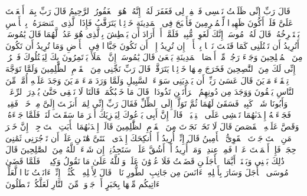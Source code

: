 \stopbuffer
\startbuffer[\q:28:16]
قَالَ رَبِّ إِنِّی ظَلَمۡتُ نَفۡسِی فَٱغۡفِرۡ لِی فَغَفَرَ لَهُۥۤۚ إِنَّهُۥ هُوَ ٱلۡغَفُورُ ٱلرَّحِیمُ%
\stopbuffer
\startbuffer[\q:28:17]
قَالَ رَبِّ بِمَاۤ أَنۡعَمۡتَ عَلَیَّ فَلَنۡ أَكُونَ ظَهِیرࣰا لِّلۡمُجۡرِمِینَ%
\stopbuffer
\startbuffer[\q:28:18]
فَأَصۡبَحَ فِی ٱلۡمَدِینَةِ خَاۤئِفࣰا یَتَرَقَّبُ فَإِذَا ٱلَّذِی ٱسۡتَنصَرَهُۥ بِٱلۡأَمۡسِ یَسۡتَصۡرِخُهُۥۚ قَالَ لَهُۥ مُوسَىٰۤ إِنَّكَ لَغَوِیࣱّ مُّبِینࣱ%
\stopbuffer
\startbuffer[\q:28:19]
فَلَمَّاۤ أَنۡ أَرَادَ أَن یَبۡطِشَ بِٱلَّذِی هُوَ عَدُوࣱّ لَّهُمَا قَالَ یَٰمُوسَىٰۤ أَتُرِیدُ أَن تَقۡتُلَنِی كَمَا قَتَلۡتَ نَفۡسَۢا بِٱلۡأَمۡسِۖ إِن تُرِیدُ إِلَّاۤ أَن تَكُونَ جَبَّارࣰا فِی ٱلۡأَرۡضِ وَمَا تُرِیدُ أَن تَكُونَ مِنَ ٱلۡمُصۡلِحِینَ%
\stopbuffer
\startbuffer[\q:28:20]
وَجَاۤءَ رَجُلࣱ مِّنۡ أَقۡصَا ٱلۡمَدِینَةِ یَسۡعَىٰ قَالَ یَٰمُوسَىٰۤ إِنَّ ٱلۡمَلَأَ یَأۡتَمِرُونَ بِكَ لِیَقۡتُلُوكَ فَٱخۡرُجۡ إِنِّی لَكَ مِنَ ٱلنَّٰصِحِینَ%
\stopbuffer
\startbuffer[\q:28:21]
فَخَرَجَ مِنۡهَا خَاۤئِفࣰا یَتَرَقَّبُۖ قَالَ رَبِّ نَجِّنِی مِنَ ٱلۡقَوۡمِ ٱلظَّٰلِمِینَ%
\stopbuffer
\startbuffer[\q:28:22]
وَلَمَّا تَوَجَّهَ تِلۡقَاۤءَ مَدۡیَنَ قَالَ عَسَىٰ رَبِّیۤ أَن یَهۡدِیَنِی سَوَاۤءَ ٱلسَّبِیلِ%
\stopbuffer
\startbuffer[\q:28:23]
وَلَمَّا وَرَدَ مَاۤءَ مَدۡیَنَ وَجَدَ عَلَیۡهِ أُمَّةࣰ مِّنَ ٱلنَّاسِ یَسۡقُونَ وَوَجَدَ مِن دُونِهِمُ ٱمۡرَأَتَیۡنِ تَذُودَانِۖ قَالَ مَا خَطۡبُكُمَاۖ قَالَتَا لَا نَسۡقِی حَتَّىٰ یُصۡدِرَ ٱلرِّعَاۤءُۖ وَأَبُونَا شَیۡخࣱ كَبِیرࣱ%
\stopbuffer
\startbuffer[\q:28:24]
فَسَقَىٰ لَهُمَا ثُمَّ تَوَلَّىٰۤ إِلَى ٱلظِّلِّ فَقَالَ رَبِّ إِنِّی لِمَاۤ أَنزَلۡتَ إِلَیَّ مِنۡ خَیۡرࣲ فَقِیرࣱ%
\stopbuffer
\startbuffer[\q:28:25]
فَجَاۤءَتۡهُ إِحۡدَىٰهُمَا تَمۡشِی عَلَى ٱسۡتِحۡیَاۤءࣲ قَالَتۡ إِنَّ أَبِی یَدۡعُوكَ لِیَجۡزِیَكَ أَجۡرَ مَا سَقَیۡتَ لَنَاۚ فَلَمَّا جَاۤءَهُۥ وَقَصَّ عَلَیۡهِ ٱلۡقَصَصَ قَالَ لَا تَخَفۡۖ نَجَوۡتَ مِنَ ٱلۡقَوۡمِ ٱلظَّٰلِمِینَ%
\stopbuffer
\startbuffer[\q:28:26]
قَالَتۡ إِحۡدَىٰهُمَا یَٰۤأَبَتِ ٱسۡتَءۡجِرۡهُۖ إِنَّ خَیۡرَ مَنِ ٱسۡتَءۡجَرۡتَ ٱلۡقَوِیُّ ٱلۡأَمِینُ%
\stopbuffer
\startbuffer[\q:28:27]
قَالَ إِنِّیۤ أُرِیدُ أَنۡ أُنكِحَكَ إِحۡدَى ٱبۡنَتَیَّ هَٰتَیۡنِ عَلَىٰۤ أَن تَأۡجُرَنِی ثَمَٰنِیَ حِجَجࣲۖ فَإِنۡ أَتۡمَمۡتَ عَشۡرࣰا فَمِنۡ عِندِكَۖ وَمَاۤ أُرِیدُ أَنۡ أَشُقَّ عَلَیۡكَۚ سَتَجِدُنِیۤ إِن شَاۤءَ ٱللَّهُ مِنَ ٱلصَّٰلِحِینَ%
\stopbuffer
\startbuffer[\q:28:28]
قَالَ ذَٰلِكَ بَیۡنِی وَبَیۡنَكَۖ أَیَّمَا ٱلۡأَجَلَیۡنِ قَضَیۡتُ فَلَا عُدۡوَٰنَ عَلَیَّۖ وَٱللَّهُ عَلَىٰ مَا نَقُولُ وَكِیلࣱ%
\stopbuffer
\startbuffer[\q:28:29]
۞ فَلَمَّا قَضَىٰ مُوسَى ٱلۡأَجَلَ وَسَارَ بِأَهۡلِهِۦۤ ءَانَسَ مِن جَانِبِ ٱلطُّورِ نَارࣰاۖ قَالَ لِأَهۡلِهِ ٱمۡكُثُوۤا۟ إِنِّیۤ ءَانَسۡتُ نَارࣰا لَّعَلِّیۤ ءَاتِیكُم مِّنۡهَا بِخَبَرٍ أَوۡ جَذۡوَةࣲ مِّنَ ٱلنَّارِ لَعَلَّكُمۡ تَصۡطَلُونَ%
